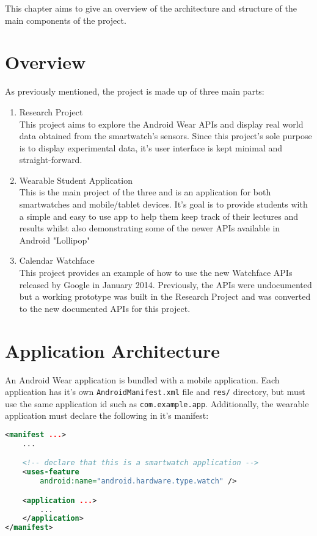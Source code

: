 This chapter aims to give an overview of the architecture and structure of the
main components of the project.

\section{Overview}
As previously mentioned, the project is made up of three main parts:
\begin{enumerate}
\item Research Project\\
This project aims to explore the Android Wear APIs and display real world data
obtained from the smartwatch's sensors. Since this project's sole purpose is to
display experimental data, it's user interface is kept minimal and
straight-forward.
\item Wearable Student Application\\
This is the main project of the three and is an application for both
smartwatches and mobile/tablet devices. It's goal is to provide students with
a simple and easy to use app to help them keep track of their lectures and
results whilst also demonstrating some of the newer APIs available in Android
"Lollipop"
\item Calendar Watchface\\
This project provides an example of how to use the new Watchface APIs released
by Google in January 2014. Previously, the APIs were undocumented but a working
prototype was built in the Research Project and was converted to the new
documented APIs for this project.

\end{enumerate}

\section{Application Architecture}
An Android Wear application is bundled with a mobile application. Each
application has it's own \texttt{AndroidManifest.xml} file and
\texttt{res/} directory, but must use the same application id such as
\texttt{com.example.app}. Additionally, the wearable application must declare
the following in it's manifest:
\begin{lstlisting}[language=XML]
<manifest ...>
    ...

    <!-- declare that this is a smartwatch application -->
    <uses-feature
        android:name="android.hardware.type.watch" />

    <application ...>
        ...
    </application>
</manifest>
\end{lstlisting}

